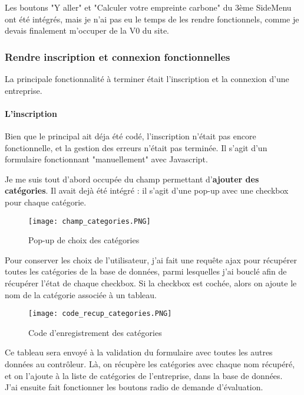 Les boutons "Y aller" et "Calculer votre empreinte carbone" du 3ème SideMenu ont été intégrés, mais je n'ai pas eu le temps de les rendre fonctionnels, comme je devais finalement m'occuper de la V0 du site.



\subsubsection{Rendre inscription et connexion fonctionnelles}
\label{inscripiton}

La principale fonctionnalité à terminer était l'inscription et la connexion d'une entreprise.

\paragraph{L'inscription}

Bien que le principal ait déja été codé, l'inscription n'était pas encore fonctionnelle, et la gestion des erreurs n'était pas terminée. Il s'agit d'un formulaire fonctionnant "manuellement" avec Javascript.

Je me suis tout d'abord occupée du champ permettant d'\textbf{ajouter des catégories}. Il avait dejà été intégré : il s'agit d'une pop-up avec une checkbox pour chaque catégorie.

\begin{figure}[H]
    \texttt{[image: champ\_categories.PNG]}
    \caption{Pop-up de choix des catégories}
\end{figure}

Pour conserver les choix de l'utilisateur, j'ai fait une requête ajax pour récupérer toutes les catégories de la base de données, parmi lesquelles j'ai bouclé afin de récupérer l'état de chaque checkbox.
Si la checkbox est cochée, alors on ajoute le nom de la catégorie associée à un tableau.

\begin{figure}[H]
    \texttt{[image: code\_recup\_categories.PNG]}
    \caption{Code d'enregistrement des catégories}
\end{figure}

Ce tableau sera envoyé à la validation du formulaire avec toutes les autres données au contrôleur.
Là, on récupère les catégories avec chaque nom récupéré, et on l'ajoute à la liste de catégories de l'entreprise, dans la base de données.\\

J'ai ensuite fait fonctionner les boutons radio de demande d'évaluation.


